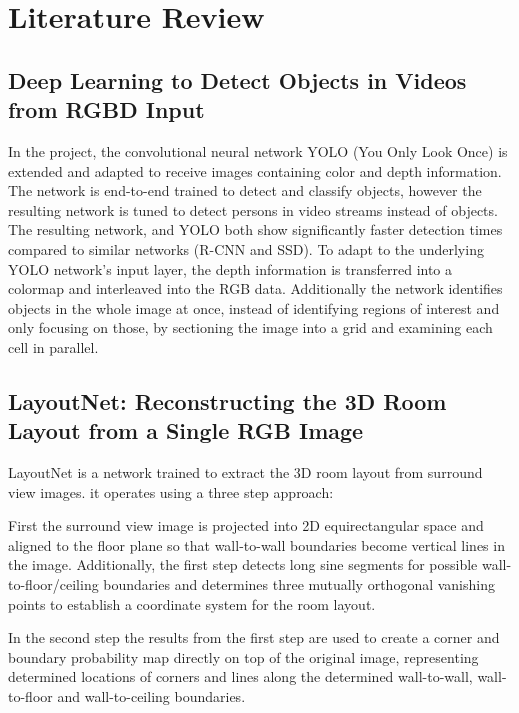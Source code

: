\documentclass[sigconf, nonacm]{acmart}
\begin{document}
\maketitle

\section{Literature Review}
\subsection{Deep Learning to Detect Objects in Videos from RGBD Input \cite{Ni9elf}}
In the project, the convolutional neural network YOLO (You Only Look Once) is extended and adapted to receive images containing color and depth information.
The network is end-to-end trained to detect and classify objects, however the resulting network is tuned to detect persons in video streams instead of objects.
The resulting network, and YOLO both show significantly faster detection times compared to similar networks (R-CNN and SSD).
To adapt to the underlying YOLO network's input layer, the depth information is transferred into a colormap and interleaved into the RGB data.
Additionally the network identifies objects in the whole image at once, instead of identifying regions of interest and only focusing on those, by sectioning the image into a grid and examining each cell in parallel.

\subsection{LayoutNet: Reconstructing the 3D Room Layout from a Single RGB Image \cite{LayoutNet}}
LayoutNet is a network trained to extract the 3D room layout from surround view images. it operates using a three step approach:

First the surround view image is projected into 2D equirectangular space and aligned to the floor plane so that wall-to-wall boundaries become vertical lines in the image.
Additionally, the first step detects long sine segments for possible wall-to-floor/ceiling boundaries and determines three mutually orthogonal vanishing points to establish a coordinate system for the room layout.

In the second step the results from the first step are used to create a corner and boundary probability map directly on top of the original image, representing determined locations of corners and lines along the determined wall-to-wall, wall-to-floor and wall-to-ceiling boundaries.
\end{document}
